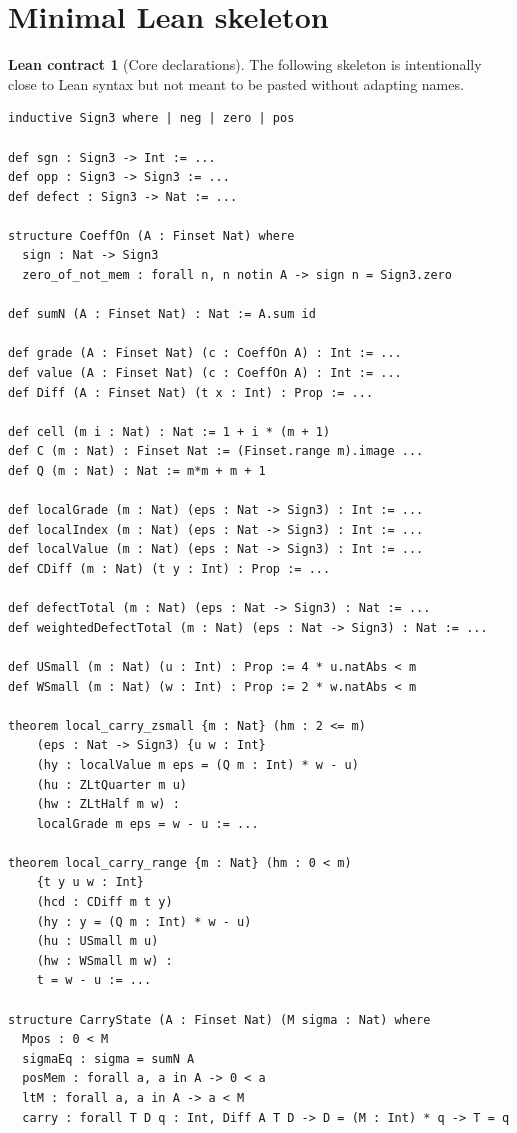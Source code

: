 \documentclass[11pt]{article}
\theoremstyle{definition}
\newtheorem{contract}[definition]{Lean contract}
\theoremstyle{plain}
\theoremstyle{remark}
\begin{document}
\section{Minimal Lean skeleton}

\begin{contract}[Core declarations]
The following skeleton is intentionally close to Lean syntax but not meant to be pasted without adapting names.
\begin{verbatim}
inductive Sign3 where | neg | zero | pos

def sgn : Sign3 -> Int := ...
def opp : Sign3 -> Sign3 := ...
def defect : Sign3 -> Nat := ...

structure CoeffOn (A : Finset Nat) where
  sign : Nat -> Sign3
  zero_of_not_mem : forall n, n notin A -> sign n = Sign3.zero

def sumN (A : Finset Nat) : Nat := A.sum id

def grade (A : Finset Nat) (c : CoeffOn A) : Int := ...
def value (A : Finset Nat) (c : CoeffOn A) : Int := ...
def Diff (A : Finset Nat) (t x : Int) : Prop := ...

def cell (m i : Nat) : Nat := 1 + i * (m + 1)
def C (m : Nat) : Finset Nat := (Finset.range m).image ...
def Q (m : Nat) : Nat := m*m + m + 1

def localGrade (m : Nat) (eps : Nat -> Sign3) : Int := ...
def localIndex (m : Nat) (eps : Nat -> Sign3) : Int := ...
def localValue (m : Nat) (eps : Nat -> Sign3) : Int := ...
def CDiff (m : Nat) (t y : Int) : Prop := ...

def defectTotal (m : Nat) (eps : Nat -> Sign3) : Nat := ...
def weightedDefectTotal (m : Nat) (eps : Nat -> Sign3) : Nat := ...

def USmall (m : Nat) (u : Int) : Prop := 4 * u.natAbs < m
def WSmall (m : Nat) (w : Int) : Prop := 2 * w.natAbs < m

theorem local_carry_zsmall {m : Nat} (hm : 2 <= m)
    (eps : Nat -> Sign3) {u w : Int}
    (hy : localValue m eps = (Q m : Int) * w - u)
    (hu : ZLtQuarter m u)
    (hw : ZLtHalf m w) :
    localGrade m eps = w - u := ...

theorem local_carry_range {m : Nat} (hm : 0 < m)
    {t y u w : Int}
    (hcd : CDiff m t y)
    (hy : y = (Q m : Int) * w - u)
    (hu : USmall m u)
    (hw : WSmall m w) :
    t = w - u := ...

structure CarryState (A : Finset Nat) (M sigma : Nat) where
  Mpos : 0 < M
  sigmaEq : sigma = sumN A
  posMem : forall a, a in A -> 0 < a
  ltM : forall a, a in A -> a < M
  carry : forall T D q : Int, Diff A T D -> D = (M : Int) * q -> T = q


\end{verbatim}
\end{contract}
\end{document}
